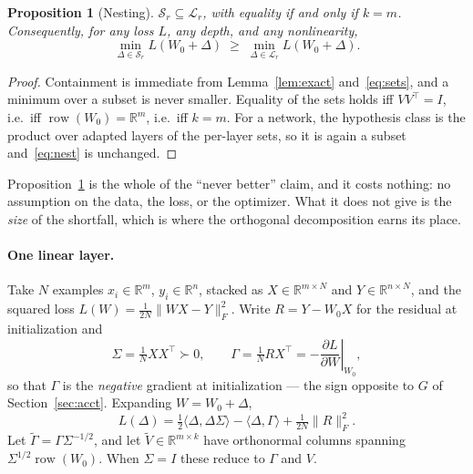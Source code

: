 \documentclass{article}
\newtheorem{proposition}[theorem]{Proposition}
\theoremstyle{remark}
\begin{document}
\begin{proposition}[Nesting]\label{prop:nest}
$\mathcal{S}_r\subseteq\mathcal{L}_r$, with equality if and only if $k=m$.
Consequently, for any loss $L$, any depth, and any nonlinearity,
\begin{equation}
  \min_{\Delta\in\mathcal{S}_r}L(W_0+\Delta)\;\ge\;\min_{\Delta\in\mathcal{L}_r}L(W_0+\Delta).
  \label{eq:nest}
\end{equation}
\end{proposition}

\begin{proof}
Containment is immediate from Lemma~\ref{lem:exact} and~\eqref{eq:sets}, and a
minimum over a subset is never smaller. Equality of the sets holds iff $VV^{\top}=I$, i.e.\ iff
$\operatorname{row}(W_0)=\mathbb{R}^{m}$, i.e.\ iff $k=m$. For a network, the
hypothesis class is the product over adapted layers of the per-layer sets, so
it is again a subset and~\eqref{eq:nest} is unchanged.
\end{proof}

Proposition~\ref{prop:nest} is the whole of the ``never better'' claim, and it
costs nothing: no assumption on the data, the loss, or the optimizer. What it
does not give is the \emph{size} of the shortfall, which is where the
orthogonal decomposition earns its place.

\paragraph{One linear layer.}
Take $N$ examples $x_i\in\mathbb{R}^{m}$, $y_i\in\mathbb{R}^{n}$, stacked as
$X\in\mathbb{R}^{m\times N}$ and $Y\in\mathbb{R}^{n\times N}$, and the squared
loss $L(W)=\tfrac{1}{2N}\|WX-Y\|_F^2$. Write $R=Y-W_0X$ for the residual at
initialization and
\begin{equation}
  \Sigma=\tfrac1N XX^{\top}\succ0,
  \qquad
  \Gamma=\tfrac1N RX^{\top}=-\left.\frac{\partial L}{\partial W}\right|_{W_0},
\end{equation}
so that $\Gamma$ is the \emph{negative} gradient at initialization --- the sign
opposite to $G$ of Section~\ref{sec:acct}. Expanding $W=W_0+\Delta$,
\begin{equation}
  L(\Delta)=\tfrac12\langle\Delta,\Delta\Sigma\rangle-\langle\Delta,\Gamma\rangle+\tfrac{1}{2N}\|R\|_F^2 .
  \label{eq:quad}
\end{equation}
Let $\widetilde\Gamma=\Gamma\Sigma^{-1/2}$, and let
$\widetilde V\in\mathbb{R}^{m\times k}$ have orthonormal columns spanning
$\Sigma^{1/2}\operatorname{row}(W_0)$. When $\Sigma=I$ these reduce to $\Gamma$
and $V$.
\end{document}
